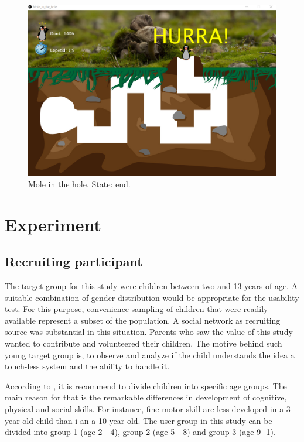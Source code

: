 \begin{figure}[h]  %
  \centering
  \includegraphics[width=.5\textwidth]{figures/EndState_Mole_in_the_hole.png}
  \caption[Mole in the hole state end.]{Mole in the hole. State: end.}
  \label{fig:endState_Mole_in_the_hole}
\end{figure}




\section{Experiment }
\label{sec:experiment}


\subsection{Recruiting participant}
\label{sec:participant}

The target group for this study were children between two and 13 years of age. A suitable combination of gender distribution would be appropriate for the usability test. For this purpose, convenience sampling of children that were readily available represent a subset of the population. A social network as recruiting source was substantial in this situation. Parents who saw the value of this study wanted to contribute and volunteered their children. 
The motive behind such young target group is, to observe and analyze if the child understands the idea a touch-less system and the ability to handle it. 

According to \cite{Gallavin2015}, it is recommend to divide children into specific age groups. The main reason for that is the remarkable differences in development of cognitive, physical and social skills. For instance, fine-motor skill are less developed in a 3 year old child than i an a 10 year old. The user group in this study can be divided into group 1 (age 2 - 4), group 2 (age 5 - 8) and group 3 (age 9 -1).

